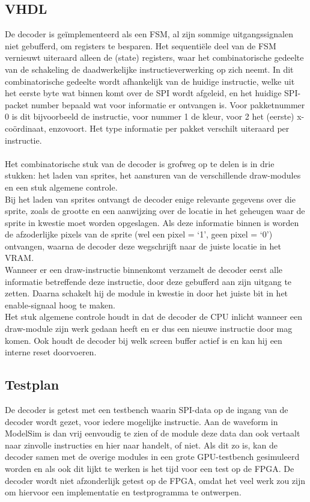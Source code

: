 \documentclass{scrartcl} %
\begin{document}
\subsection{VHDL}
De decoder is geïmplementeerd als een FSM, al zijn sommige uitgangssignalen niet gebufferd, om registers te besparen. Het sequentiële deel van de FSM vernieuwt uiteraard alleen de (state) registers, waar het combinatorische gedeelte van de schakeling de daadwerkelijke instructieverwerking op zich neemt. In dit combinatorische gedeelte wordt afhankelijk van de huidige instructie, welke uit het eerste byte wat binnen komt over de SPI wordt afgeleid, en het huidige SPI-packet number bepaald wat voor informatie er ontvangen is. Voor pakketnummer 0 is dit bijvoorbeeld de instructie, voor nummer 1 de kleur, voor 2 het (eerste) x-coördinaat, enzovoort. Het type informatie per pakket verschilt uiteraard per instructie.
\\\\
Het combinatorische stuk van de decoder is grofweg op te delen is in drie stukken: het laden van sprites, het aansturen van de verschillende draw-modules en een stuk algemene controle.
\\
Bij het laden van sprites ontvangt de decoder enige relevante gegevens over die sprite, zoals de grootte en een aanwijzing over de locatie in het geheugen waar de sprite in kwestie moet worden opgeslagen. Als deze informatie binnen is worden de afzoderlijke pixels van de sprite (wel een pixel = `1', geen pixel = `0') ontvangen, waarna de decoder deze wegschrijft naar de juiste locatie in het VRAM.
\\
Wanneer er een draw-instructie binnenkomt verzamelt de decoder eerst alle informatie betreffende deze instructie, door deze gebufferd aan zijn uitgang te zetten. Daarna schakelt hij de module in kwestie in door het juiste bit in het enable-signaal hoog te maken.
\\
Het stuk algemene controle houdt in dat de decoder de CPU inlicht wanneer een draw-module zijn werk gedaan heeft en er dus een nieuwe instructie door mag komen. Ook houdt de decoder bij welk screen buffer actief is en kan hij een interne reset doorvoeren.

\subsection{Testplan}
De decoder is getest met een testbench waarin SPI-data op de ingang van de decoder wordt gezet, voor iedere mogelijke instructie. Aan de waveform in ModelSim is dan vrij eenvoudig te zien of de module deze data dan ook vertaalt naar zinvolle instructies en hier naar handelt, of niet. Als dit zo is, kan de decoder samen met de overige modules in een grote GPU-testbench gesimuleerd worden en als ook dit lijkt te werken is het tijd voor een test op de FPGA. De decoder wordt niet afzonderlijk getest op de FPGA, omdat het veel werk zou zijn om hiervoor een implementatie en testprogramma te ontwerpen.
\end{document}
